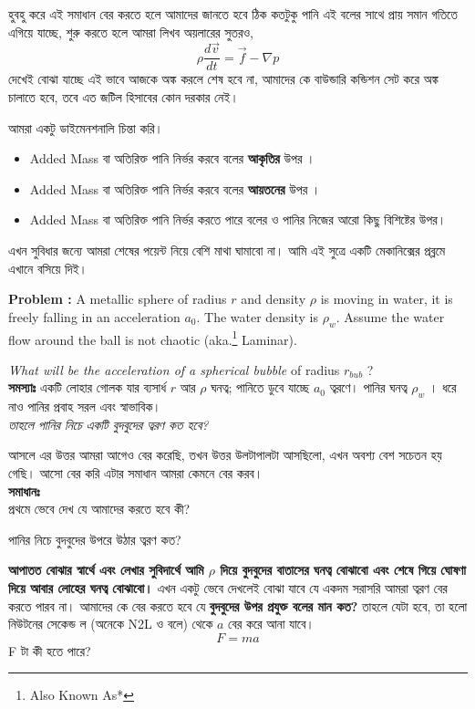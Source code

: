 \documentclass[11pt,a4paper]{article}
\begin{document}
হুবহু করে এই সমাধান বের করতে হলে আমাদের জানতে হবে ঠিক কতটুকু পানি এই বলের সাথে প্রায় সমান গতিতে এগিয়ে যাচ্ছে, শুরু করতে হলে আমরা লিখব অয়লারের সুতরও,
\[ \rho \frac{d \vec{v}}{dt } = \vec{f} - \nabla p \]
দেখেই বোঝা যাচ্ছে এই ভাবে আজকে অঙ্ক করলে শেষ হবে না, আমাদের কে বাউন্ডারি কন্ডিশন সেট করে অঙ্ক চালাতে হবে, তবে এত জটিল হিসাবের কোন দরকার নেই। 

আমরা একটু ডাইমেনশনালি চিন্তা করি। 
\begin{itemize}
\item Added Mass বা অতিরিক্ত পানি নির্ভর করবে বলের \textbf{আকৃতির} উপর । 
\item Added Mass বা অতিরিক্ত পানি নির্ভর করবে বলের \textbf{আয়তনের} উপর ।
\item Added Mass বা অতিরিক্ত পানি নির্ভর করতে পারে বলের ও পানির নিজের আরো কিছু বিশিষ্টের উপর। 
\end{itemize}
এখন সুবিধার জন্যে আমরা শেষের পয়েন্ট নিয়ে বেশি মাথা ঘামাবো না। আমি এই সুত্রে একটি মেকানিক্সের প্রব্লমে এখানে বসিয়ে দিই। 
\begin{tcolorbox}[breakable]
\textbf{Problem :} A metallic sphere of radius $r$ and density $\rho$ is moving in water, it is freely falling in an acceleration $a_0$. The water density is $\rho _w$. Assume the water flow around the ball is not chaotic (aka.\footnote{Also Known As*} Laminar). 

\textit{What will be the acceleration of a spherical bubble} of radius $r_{bub}$ ? \\
\textbf{সমস্যাঃ} একটি লোহার গোলক যার ব্যসার্ধ $r$ আর $\rho$ ঘনত্ব; পানিতে ডুবে যাচ্ছে $a_0$ ত্বরণে। পানির ঘনত্ব $\rho _w$ । ধরে নাও পানির প্রবাহ সরল এবং স্বাভাবিক। \\
\textit{তাহলে পানির নিচে একটি বুদবুদের ত্বরণ কত হবে? }
\end{tcolorbox}
আসলে এর উত্তর আমরা আগেও বের করেছি, তখন উত্তর উলটাপালটা আসছিলো, এখন অবশ্য বেশ সচেতন হয় গেছি। আসো বের করি এটার সমাধান আমরা কেমনে বের করব। \\

\textbf{সমাধানঃ} \\
প্রথমে ভেবে দেখ যে আমাদের করতে হবে কী? 
\begin{center}
পানির নিচে বুদবুদের উপরে উঠার ত্বরণ কত? 
\end{center}
\textbf{আপাতত বোঝার স্বার্থে এবং লেখার সুবিদার্থে আমি $\rho$ দিয়ে বুদবুদের বাতাসের ঘনত্ব বোঝাবো এবং শেষে গিয়ে ঘোষণা দিয়ে আবার লোহের ঘনত্ব বোঝাবো। }
এখন একটু ভেবে দেখলেই বোঝা যাবে যে একদম সরাসরি আমরা ত্বরণ বের করতে পারব না। আমাদের কে বের করতে হবে যে \textbf{বুদবুদের উপর প্রযুক্ত বলের মান কত?} তাহলে যেটা হবে, তা হলো নিউটনের সেকেন্ড ল (অনেকে N2L ও বলে) থেকে $a$ বের করে আনা যাবে। 
\[ F = ma \]
F টা কী হতে পারে?
\end{document}
